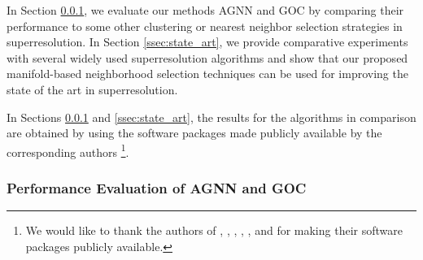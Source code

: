 \documentclass[journal]{IEEEtran}
\begin{document}


In Section \ref{ssec:agnn_goc}, we evaluate our methods AGNN and GOC by comparing their performance to some other clustering or nearest neighbor selection strategies in superresolution. In Section \ref{ssec:state_art}, we provide comparative experiments with several widely used superresolution algorithms and show that our proposed manifold-based neighborhood selection techniques can be used for improving the state of the art in superresolution.

In Sections \ref{ssec:agnn_goc} and \ref{ssec:state_art}, the results for the algorithms in comparison are obtained by using the software packages made publicly available by the corresponding authors \footnote{We would like to thank the authors of \cite{Dong13nonlocally}, \cite{Dong11image}, \cite{Donoser13replicator}, \cite{Peleg14a},  \cite{Shi00normalized}, \cite{Bezdek1984} and \cite{Dijkstra59a} for making their software packages publicly available.}.



%
\subsubsection{Performance Evaluation of AGNN and GOC}
\label{ssec:agnn_goc}
\end{document}
